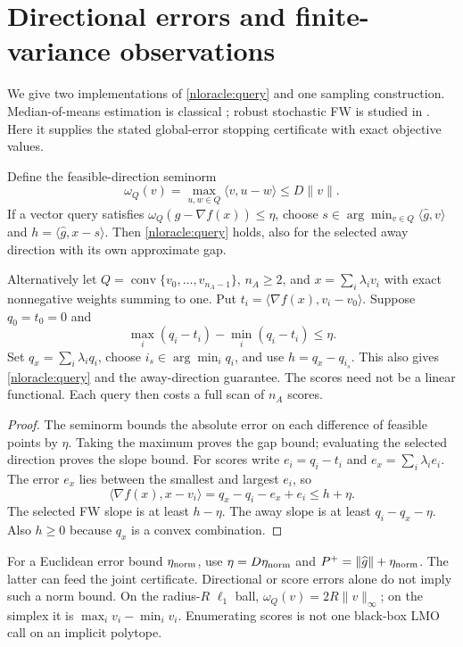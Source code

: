 \section{Directional errors and finite-variance observations}
\label{diroracle:section}
We give two implementations of \eqref{nloracle:query} and one sampling
construction. Median-of-means estimation is classical \cite{dirlugosi};
robust stochastic FW is studied in \cite{dirtang,dirsfyraki}.
Here it supplies the stated global-error stopping certificate with
exact objective values.

\begin{proposition}
\label{diroracle:width-transfer}\label{diroracle:scores}
Define the feasible-direction seminorm
\[
 \omega_Q(v)=\max_{u,w\in Q}\langle v,u-w\rangle\le D\|v\|.
\]
If a vector query satisfies $\omega_Q(\widehat g-\nabla f(x))\le\eta$,
choose $s\in\arg\min_{v\in Q}\langle\widehat g,v\rangle$ and
$h=\langle\widehat g,x-s\rangle$. Then \eqref{nloracle:query} holds,
also for the selected away direction with its own approximate gap.

Alternatively let $Q=\operatorname{conv}\{v_0,\ldots,v_{n_A-1}\}$,
$n_A\ge2$, and $x=\sum_i\lambda_i v_i$ with exact nonnegative weights
summing to one. Put $t_i=\langle\nabla f(x),v_i-v_0\rangle$.
Suppose $q_0=t_0=0$ and
\begin{equation}\label{diroracle:score-error}
 \max_i(q_i-t_i)-\min_i(q_i-t_i)\le\eta.
\end{equation}
Set $q_x=\sum_i\lambda_iq_i$, choose $i_s\in\arg\min_i q_i$, and
use $h=q_x-q_{i_s}$. This also gives \eqref{nloracle:query} and the
away-direction guarantee. The scores need not be a linear functional.
Each query then costs a full scan of $n_A$ scores.
\end{proposition}
\begin{proof}
The seminorm bounds the absolute error on each difference of feasible
points by $\eta$. Taking the maximum proves the gap bound; evaluating
the selected direction proves the slope bound.
For scores write $e_i=q_i-t_i$ and $e_x=\sum_i\lambda_i e_i$.
The error $e_x$ lies between the smallest and largest $e_i$, so
\[
 \langle\nabla f(x),x-v_i\rangle=q_x-q_i-e_x+e_i\le h+\eta.
\]
The selected FW slope is at least $h-\eta$. The away slope is at least
$q_i-q_x-\eta$. Also $h\ge0$ because $q_x$ is a convex combination.
\end{proof}

For a Euclidean error bound $\eta_{\rm norm}$, use
$\eta=D\eta_{\rm norm}$ and $P^+=\|\widehat g\|+\eta_{\rm norm}$.
The latter can feed the joint certificate. Directional or score errors
alone do not imply such a norm bound. On the radius-$R$ $\ell_1$ ball,
$\omega_Q(v)=2R\|v\|_\infty$; on the simplex it is
$\max_i v_i-\min_i v_i$. Enumerating scores is not one black-box LMO
call on an implicit polytope.

